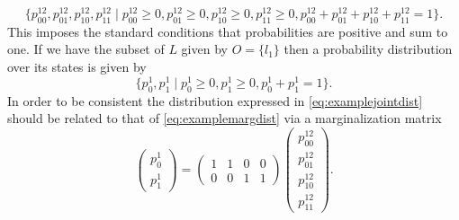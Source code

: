 \begin{equation}\label{eq:examplejointdist}
\{p^{12}_{00},p^{12}_{01},p^{12}_{10},p^{12}_{11} \mid p^{12}_{00} \geq 0, p^{12}_{01} \geq 0,p^{12}_{10} \geq 0,p^{12}_{11} \geq 0, p^{12}_{00} + p^{12}_{01} + p^{12}_{10} + p^{12}_{11} = 1 \}.
\end{equation}
This imposes the standard conditions that probabilities are positive and sum to one. If we have the subset of $L$ given by $O = \{l_1\}$ then a probability distribution over its states is given by
\begin{equation}\label{eq:examplemargdist}
\{p^{1}_{0}, p^{1}_{1} \mid p^{1}_{0} \geq 0, p^{1}_{1} \geq 0, p^{1}_{0}+p^{1}_{1} = 1 \}.
\end{equation}
In order to be consistent the distribution expressed in \ref{eq:examplejointdist} should be related to that of \ref{eq:examplemargdist} via a marginalization matrix
\begin{equation}
\begin{pmatrix}
p^{1}_{0}\\
p^{1}_{1}
\end{pmatrix} = \begin{pmatrix}
1 & 1 & 0 & 0\\
0 & 0 & 1 & 1
\end{pmatrix}
\begin{pmatrix}
p^{12}_{00}\\
p^{12}_{01}\\
p^{12}_{10}\\
p^{12}_{11}
\end{pmatrix}.
\end{equation}

